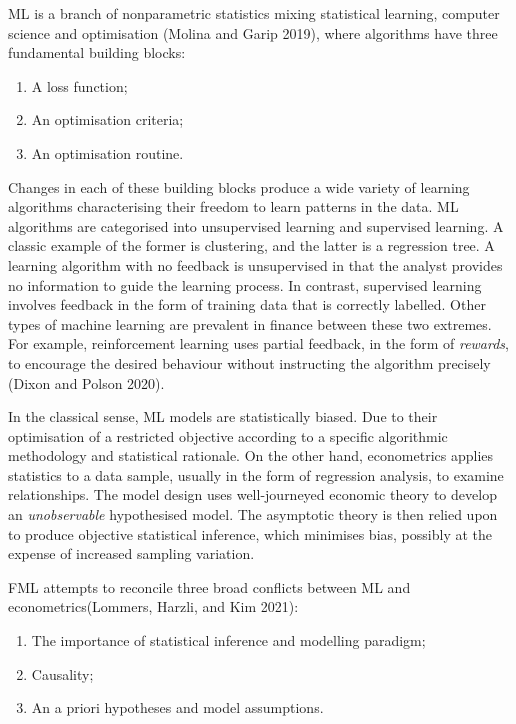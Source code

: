 \documentclass{article}
\begin{document}
ML is a branch of nonparametric statistics mixing statistical learning,
computer science and optimisation (Molina and Garip 2019), where
algorithms have three fundamental building blocks:

\begin{enumerate}
\def\labelenumi{\arabic{enumi}.}
\tightlist
\item
  A loss function;
\item
  An optimisation criteria;
\item
  An optimisation routine.
\end{enumerate}

Changes in each of these building blocks produce a wide variety of
learning algorithms characterising their freedom to learn patterns in
the data. ML algorithms are categorised into unsupervised learning and
supervised learning. A classic example of the former is clustering, and
the latter is a regression tree. A learning algorithm with no feedback
is unsupervised in that the analyst provides no information to guide the
learning process. In contrast, supervised learning involves feedback in
the form of training data that is correctly labelled. Other types of
machine learning are prevalent in finance between these two extremes.
For example, reinforcement learning uses partial feedback, in the form
of \emph{rewards}, to encourage the desired behaviour without
instructing the algorithm precisely (Dixon and Polson 2020).

In the classical sense, ML models are statistically biased. Due to their
optimisation of a restricted objective according to a specific
algorithmic methodology and statistical rationale. On the other hand,
econometrics applies statistics to a data sample, usually in the form of
regression analysis, to examine relationships. The model design uses
well-journeyed economic theory to develop an \emph{unobservable}
hypothesised model. The asymptotic theory is then relied upon to produce
objective statistical inference, which minimises bias, possibly at the
expense of increased sampling variation.

FML attempts to reconcile three broad conflicts between ML and
econometrics(Lommers, Harzli, and Kim 2021):

\begin{enumerate}
\def\labelenumi{\arabic{enumi}.}
\tightlist
\item
  The importance of statistical inference and modelling paradigm;
\item
  Causality;
\item
  An a priori hypotheses and model assumptions.
\end{enumerate}
\end{document}
